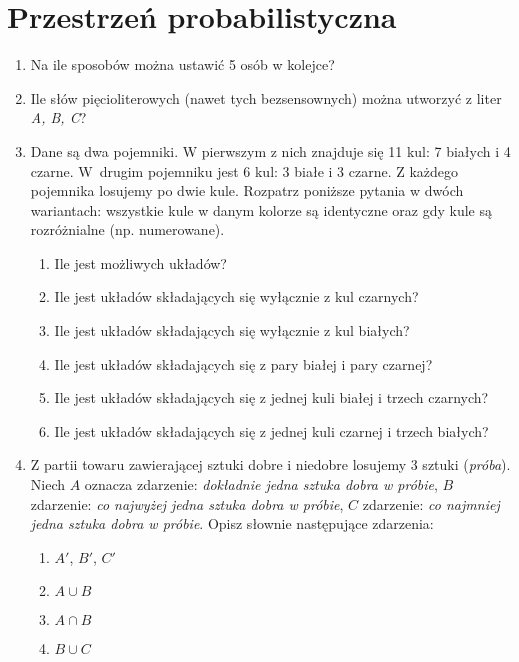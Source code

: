 \documentclass{mwart}
\newcommand{\ans}[1]{}
\begin{document}
\section{Przestrzeń probabilistyczna}
\begin{enumerate}
\item Na ile sposobów można ustawić 5 osób w kolejce? \ans{$5!$}
\item Ile słów pięcioliterowych (nawet tych bezsensownych) można utworzyć z liter \emph{A, B, C}? \ans{$3^5=243$}
\item Dane są dwa pojemniki. W pierwszym z nich znajduje się 11 kul: 7 białych i 4 czarne. W~drugim pojemniku jest 6 kul: 3 białe i 3 czarne. Z każdego pojemnika losujemy po dwie kule.
Rozpatrz poniższe pytania w dwóch wariantach: wszystkie kule w danym kolorze są identyczne oraz gdy kule są rozróżnialne (np. numerowane).
\begin{enumerate}
\item Ile jest możliwych układów? \ans{${11 \choose 2}{6 \choose 2}=825$}
\item Ile jest układów składających się wyłącznie z kul czarnych? \ans{${4 \choose 2}{3 \choose 2}=18$}
\item Ile jest układów składających się wyłącznie z kul białych? \ans{${7 \choose 2}{3 \choose 2}=63$}
\item Ile jest układów składających się z pary białej i pary czarnej? \ans{${7\choose 2}{3 \choose 2}+{4 \choose 2}{3 \choose 2}+7\cdot4\cdot3\cdot3=333$}
\item Ile jest układów składających się z jednej kuli białej i trzech czarnych? \ans{$7\cdot4\cdot{3\choose 2}+3\cdot3\cdot{4\choose 2}=138$}
\item Ile jest układów składających się z jednej kuli czarnej i trzech białych?  \ans{$4\cdot7\cdot{3\choose 2}+3\cdot3\cdot{7\choose 2}=273$}
\end{enumerate}
\item Z partii towaru zawierającej sztuki dobre i niedobre losujemy 3 sztuki (\emph{próba}). Niech $A$ oznacza zdarzenie: \emph{dokładnie jedna sztuka dobra w próbie}, $B$ zdarzenie: \emph{co najwyżej jedna sztuka dobra w próbie}, $C$ zdarzenie: \emph{co najmniej jedna sztuka dobra w próbie}. Opisz słownie następujące zdarzenia:
\begin{enumerate}
\item $A'$, $B'$, $C'$
\item $A\cup B$
\item $A\cap B$
\item $B\cup C$

\end{enumerate}
\end{enumerate}
\end{document}

